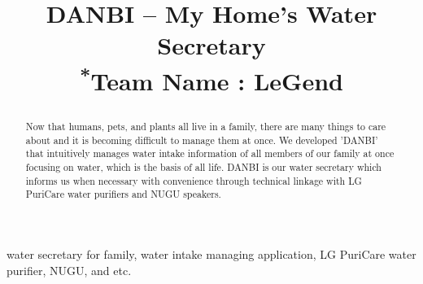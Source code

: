 \documentclass[conference]{IEEEtran}
\begin{document}
\title{DANBI – My Home’s Water Secretary\\
{\footnotesize \textsuperscript{*}Team Name : LeGend}

}

\author{
\and
{}
\and
{}
\and
{}

}

\maketitle

\begin{abstract}
Now that humans, pets, and plants all live in a family, there are many things to care about and it is becoming difficult to manage them at once. We developed 'DANBI' that intuitively manages water intake information of all members of our family at once focusing on water, which is the basis of all life. DANBI is our water secretary which informs us when necessary with convenience through technical linkage with LG PuriCare water purifiers and NUGU speakers.
\end{abstract}

\begin{IEEEkeywords}
water secretary for family, water intake managing application, LG PuriCare water purifier, NUGU, and etc.
\end{IEEEkeywords}

\ 
\end{document}

